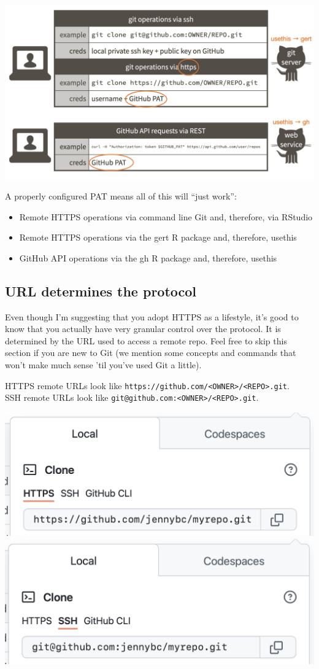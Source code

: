 \documentclass[
]{book}
\providecommand{\tightlist}{%
  \setlength{\itemsep}{0pt}\setlength{\parskip}{0pt}}
\begin{document}
\begin{center}\includegraphics[width=0.8\linewidth]{img/pat-kills-both-birds} \end{center}

A properly configured PAT means all of this will ``just work'':

\begin{itemize}
\tightlist
\item
  Remote HTTPS operations via command line Git and, therefore, via RStudio
\item
  Remote HTTPS operations via the gert R package and, therefore, usethis
\item
  GitHub API operations via the gh R package and, therefore, usethis
\end{itemize}

\subsection{URL determines the protocol}\label{url-determines-protocol}

Even though I'm suggesting that you adopt HTTPS as a lifestyle, it's good to know that you actually have very granular control over the protocol.
It is determined by the URL used to access a remote repo.
Feel free to skip this section if you are new to Git (we mention some concepts and commands that won't make much sense 'til you've used Git a little).

HTTPS remote URLs look like \texttt{https://github.com/\textless{}OWNER\textgreater{}/\textless{}REPO\textgreater{}.git}.\\
SSH remote URLs look like \texttt{git@github.com:\textless{}OWNER\textgreater{}/\textless{}REPO\textgreater{}.git}.

\includegraphics[width=0.49\linewidth,height=0.49\textheight]{img/github-https-url} \includegraphics[width=0.49\linewidth,height=0.49\textheight]{img/github-ssh-url}
\end{document}
